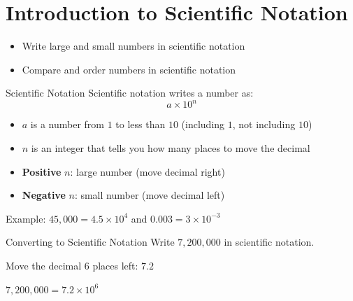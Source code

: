 \section{Introduction to Scientific Notation}

\begin{learningGoals}
\begin{itemize}
    \item Write large and small numbers in scientific notation
    \item Compare and order numbers in scientific notation
\end{itemize}
\end{learningGoals}

\begin{conceptBox}{Scientific Notation}
Scientific notation writes a number as:
$$a \times 10^n$$
\begin{itemize}[leftmargin=*]
    \item $a$ is a number from $1$ to less than $10$ (including $1$, not including $10$)
    \item $n$ is an integer that tells you how many places to move the decimal
    \item \textbf{Positive} $n$: large number (move decimal right)
    \item \textbf{Negative} $n$: small number (move decimal left)
\end{itemize}
Example: $45{,}000 = 4.5 \times 10^4$ \quad and \quad $0.003 = 3 \times 10^{-3}$
\end{conceptBox}

\begin{workedExample}{Converting to Scientific Notation}
Write $7{,}200{,}000$ in scientific notation.

Move the decimal $6$ places left: $7.2$

$7{,}200{,}000 = 7.2 \times 10^6$
\end{workedExample}


